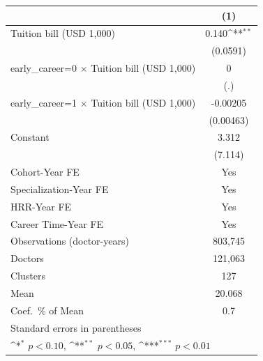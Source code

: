 {
\def\sym#1{\ifmmode^{#1}\else\(^{#1}\)\fi}
\begin{tabular}{l*{1}{c}}
\hline\hline
                    &\multicolumn{1}{c}{(1)}         \\
\hline
Tuition bill (USD 1,000)&       0.140\sym{**} \\
                    &    (0.0591)         \\
[1em]
early\_career=0 $\times$ Tuition bill (USD 1,000)&           0         \\
                    &         (.)         \\
[1em]
early\_career=1 $\times$ Tuition bill (USD 1,000)&    -0.00205         \\
                    &   (0.00463)         \\
[1em]
Constant            &       3.312         \\
                    &     (7.114)         \\
[1em]
Cohort-Year FE      &         Yes         \\
[1em]
Specialization-Year FE&         Yes         \\
[1em]
HRR-Year FE         &         Yes         \\
[1em]
Career Time-Year FE &         Yes         \\
\hline
Observations (doctor-years)&     803,745         \\
Doctors             &     121,063         \\
Clusters            &         127         \\
Mean                &      20.068         \\
Coef.\ \% of Mean   &         0.7         \\
\hline\hline
\multicolumn{2}{l}{\footnotesize Standard errors in parentheses}\\
\multicolumn{2}{l}{\footnotesize \sym{*} \(p<0.10\), \sym{**} \(p<0.05\), \sym{***} \(p<0.01\)}\\
\end{tabular}
}
